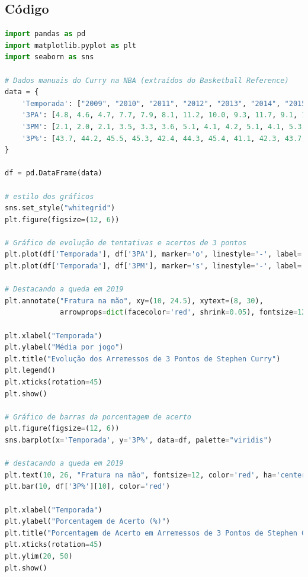 \subsection*{\textbf{Código}}

\begin{lstlisting}[language=Python, style=input]
import pandas as pd
import matplotlib.pyplot as plt
import seaborn as sns

# Dados manuais do Curry na NBA (extraídos do Basketball Reference)
data = {
    'Temporada': ["2009", "2010", "2011", "2012", "2013", "2014", "2015", "2016", "2017", "2018", "2019", "2020", "2021", "2022", "2023", "2024"],
    '3PA': [4.8, 4.6, 4.7, 7.7, 7.9, 8.1, 11.2, 10.0, 9.3, 11.7, 9.1, 12.7, 11.7, 11.4, 11.8, 11.2],  # Tentativas de 3 pontos
    '3PM': [2.1, 2.0, 2.1, 3.5, 3.3, 3.6, 5.1, 4.1, 4.2, 5.1, 4.1, 5.3, 4.5, 4.9, 4.8, 4.5],  # Acertos de 3 pontos
    '3P%': [43.7, 44.2, 45.5, 45.3, 42.4, 44.3, 45.4, 41.1, 42.3, 43.7, 24.5, 42.1, 38.0, 42.7, 40.8, 40.1]  # Porcentagem de acerto
}

df = pd.DataFrame(data)

# estilo dos gráficos
sns.set_style("whitegrid")
plt.figure(figsize=(12, 6))

# Gráfico de evolução de tentativas e acertos de 3 pontos
plt.plot(df['Temporada'], df['3PA'], marker='o', linestyle='-', label='Tentativas de 3 pontos (3PA)', color='blue')
plt.plot(df['Temporada'], df['3PM'], marker='s', linestyle='-', label='Acertos de 3 pontos (3PM)', color='green')

# Destacando a queda em 2019
plt.annotate("Fratura na mão", xy=(10, 24.5), xytext=(8, 30),
             arrowprops=dict(facecolor='red', shrink=0.05), fontsize=12, color='red')

plt.xlabel("Temporada")
plt.ylabel("Média por jogo")
plt.title("Evolução dos Arremessos de 3 Pontos de Stephen Curry")
plt.legend()
plt.xticks(rotation=45)
plt.show()

# Gráfico de barras da porcentagem de acerto
plt.figure(figsize=(12, 6))
sns.barplot(x='Temporada', y='3P%', data=df, palette="viridis")

# destacando a queda em 2019
plt.text(10, 26, "Fratura na mão", fontsize=12, color='red', ha='center')
plt.bar(10, df['3P%'][10], color='red')

plt.xlabel("Temporada")
plt.ylabel("Porcentagem de Acerto (%)")
plt.title("Porcentagem de Acerto em Arremessos de 3 Pontos de Stephen Curry")
plt.xticks(rotation=45)
plt.ylim(20, 50)
plt.show()
\end{lstlisting}